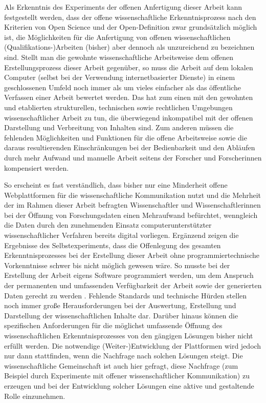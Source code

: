 Als Erkenntnis des Experiments der offenen Anfertigung dieser Arbeit kann festgestellt werden, dass der offene wissenschaftliche Erkenntnisprozess nach den Kriterien von Open Science und der Open-Definition zwar grundsätzlich möglich ist, die Möglichkeiten für die Anfertigung von offenen wissenschaftlichen (Qualifikations-)Arbeiten (bisher) aber dennoch als unzureichend zu bezeichnen sind. Stellt man die gewohnte wissenschaftliche Arbeitsweise dem offenen Erstellungsprozess dieser Arbeit gegenüber, so muss die Arbeit auf dem lokalen Computer (selbst bei der Verwendung internetbasierter Dienste) in einem geschlossenen Umfeld noch immer als um vieles einfacher als das öffentliche Verfassen einer Arbeit bewertet werden. Das hat zum einen mit den gewohnten und etablierten strukturellen, technischen sowie rechtlichen Umgebungen wissenschaftlicher Arbeit zu tun, die überwiegend inkompatibel mit der offenen Darstellung und Verbreitung von Inhalten sind. Zum anderen müssen die fehlenden Möglichkeiten und Funktionen für die offene Arbeitsweise sowie die daraus resultierenden Einschränkungen bei der Bedienbarkeit und den Abläufen durch mehr Aufwand und manuelle Arbeit seitens der Forscher und Forscherinnen kompensiert werden.

So erscheint es fast verständlich, dass bisher nur eine Minderheit offene Webplattformen für die wissenschaftliche Kommunikation \cite{Perkel_2014} nutzt und die Mehrheit der im Rahmen dieser Arbeit befragten Wissenschaftler und Wissenschaftlerinnen bei der Öffnung von Forschungsdaten einen Mehraufwand befürchtet, wenngleich die Daten durch den zunehmenden Einsatz computerunterstützter wissenschaftlicher Verfahren bereits digital vorliegen. Ergänzend zeigen die Ergebnisse des Selbstexperiments, dass die Offenlegung des gesamten Erkenntnisprozesses bei der Erstellung dieser Arbeit ohne programmiertechnische Vorkenntnisse schwer bis nicht möglich gewesen wäre. So musste bei der Erstellung der Arbeit eigens Software programmiert werden, um dem Anspruch der permanenten und umfassenden Verfügbarkeit der Arbeit sowie der generierten Daten gerecht zu werden \cite{Heise_2015c}. Fehlende Standards und technische Hürden stellen noch immer große Herausforderungen bei der Auswertung, Erstellung und Darstellung der wissenschaftlichen Inhalte dar. Darüber hinaus können die spezifischen Anforderungen für die möglichst umfassende Öffnung des wissenschaftlichen Erkenntnisprozesses von den gängigen Lösungen bisher nicht erfüllt werden. Die notwendige (Weiter-)Entwicklung der Plattformen wird jedoch nur dann stattfinden, wenn die Nachfrage nach solchen Lösungen steigt. Die wissenschaftliche Gemeinschaft ist auch hier gefragt, diese Nachfrage (zum Beispiel durch Experimente mit offener wissenschaftlicher Kommunikation) zu erzeugen und bei der Entwicklung solcher Lösungen eine aktive und gestaltende Rolle einzunehmen.

